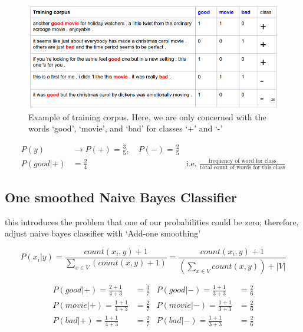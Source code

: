 \documentclass[11pt]{article}
\begin{document}
\begin{figure}[H]
    \centering
    \includegraphics*[width=\linewidth]{figures/example.png}
    \caption{Example of training corpus. Here, we are only concerned with the words `good', `movie', and `bad' for classes `+' and `-'}
\end{figure}

\begin{align*}
    P(y) & \rightarrow P(+) = \frac 3 5, \quad P(-) = \frac 2 5 \\ 
    P(good|+) & = \frac 2 4 & \text{i.e. } \frac{\text{frequency of word for class}}{\text{total count of words for this class}}
\end{align*}

\subsection{One smoothed Naive Bayes Classifier}

this introduces the problem that one of our probabilities could be zero; therefore, adjust naive bayes classifier with `Add-one smoothing'

\begin{definition}\label{eq:add-one-smoothing}
    \begin{equation*}
        P(x_i|y) = \frac{count(x_i,y)+1}{\sum_{x\in V}(count(x,y)+1)} = \frac{count(x_i, y) + 1}{(\sum_{x\in V} count(x,y)) + |V|}
    \end{equation*}
\end{definition}

\begin{align*}
    P(good|+) = \frac {2 + 1} {4 + 3} & = \frac 3 7 & P(good|-) = \frac{1 + 1}{3 + 3} & = \frac 2 6 \\
    P(movie|+) = \frac{1 + 1}{4 + 3} & = \frac 2 7  & P(movie|-) = \frac{1 + 1}{3 + 3} & = \frac 2 6  \\
    P(bad|+) = \frac{1 + 1}{4 + 3} & = \frac 2 7  & P(bad|-) = \frac{1 + 1}{3 + 3} & = \frac 2 6
\end{align*} 
\end{document}
